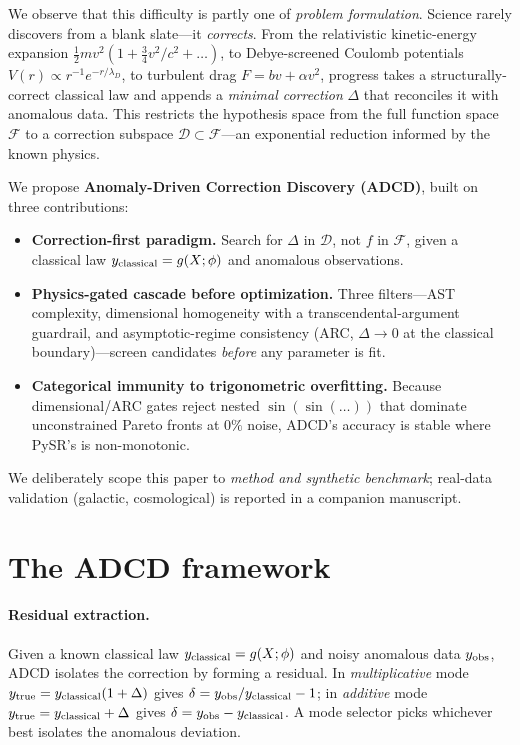 \documentclass{article}
\begin{document}
We observe that this difficulty is partly one of \emph{problem formulation}. Science rarely discovers from a blank slate---it \emph{corrects}. From the relativistic kinetic-energy expansion $\tfrac12 mv^2(1+\tfrac34 v^2/c^2+\dots)$, to Debye-screened Coulomb potentials $V(r)\propto r^{-1}e^{-r/\lambda_D}$, to turbulent drag $F=bv+\alpha v^2$, progress takes a structurally-correct classical law and appends a \emph{minimal correction} $\Delta$ that reconciles it with anomalous data. This restricts the hypothesis space from the full function space $\mathcal{F}$ to a correction subspace $\mathcal{D}\subset\mathcal{F}$---an exponential reduction informed by the known physics.

We propose \textbf{Anomaly-Driven Correction Discovery (ADCD)}, built on three contributions:
\begin{itemize}[leftmargin=14pt]
  \item[\textbf{C1}] \textbf{Correction-first paradigm.} Search for $\Delta$ in $\mathcal{D}$, not $f$ in $\mathcal{F}$, given a classical law $y_{\rm classical}=g(X;\phi)$ and anomalous observations.
  \item[\textbf{C2}] \textbf{Physics-gated cascade before optimization.} Three filters---AST complexity, dimensional homogeneity with a transcendental-argument guardrail, and asymptotic-regime consistency (ARC, $\Delta\!\to\!0$ at the classical boundary)---screen candidates \emph{before} any parameter is fit.
  \item[\textbf{C3}] \textbf{Categorical immunity to trigonometric overfitting.} Because dimensional/ARC gates reject nested $\sin(\sin(\dots))$ that dominate unconstrained Pareto fronts at $0\%$ noise, ADCD's accuracy is stable where PySR's is non-monotonic.
\end{itemize}
We deliberately scope this paper to \emph{method and synthetic benchmark}; real-data validation (galactic, cosmological) is reported in a companion manuscript.

\section{The ADCD framework}
\label{sec:method}

\paragraph{Residual extraction.}
Given a known classical law $y_{\rm classical}=g(X;\phi)$ and noisy anomalous data $y_{\rm obs}$, ADCD isolates the correction by forming a residual. In \emph{multiplicative} mode $y_{\rm true}=y_{\rm classical}(1+\Delta)$ gives $\delta=y_{\rm obs}/y_{\rm classical}-1$; in \emph{additive} mode $y_{\rm true}=y_{\rm classical}+\Delta$ gives $\delta=y_{\rm obs}-y_{\rm classical}$. A mode selector picks whichever best isolates the anomalous deviation.
\end{document}
